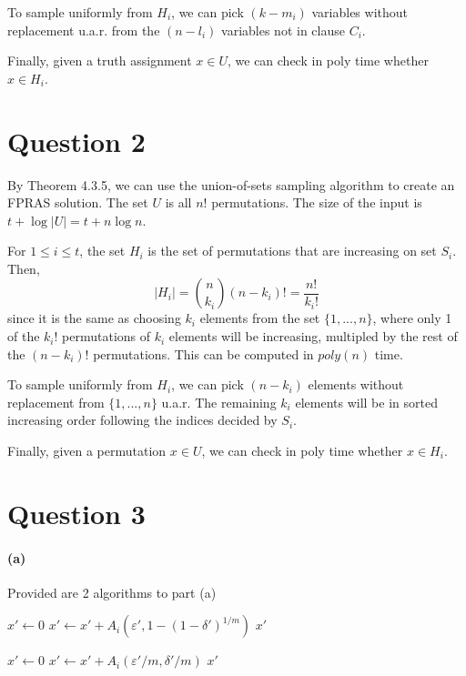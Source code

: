 \documentclass[11pt]{article} %
\begin{document}
To sample uniformly from $H_i$, we can pick $(k-m_i)$ variables without replacement u.a.r.
from the $(n-l_i)$ variables not in clause $C_i$.

Finally, given a truth assignment $x\in U$, we can check in poly time whether $x \in H_i$.

\clearpage
\section*{Question 2}

By Theorem 4.3.5, we can use the union-of-sets sampling algorithm to create an FPRAS solution.
The set $U$ is all $n!$ permutations.
The size of the input is $t+\log |U| = t+n\log n$.

For $1 \leq i \leq t$, the set $H_i$ is the set of permutations
that are increasing on set $S_i$.
Then,
\[|H_i| = \binom{n}{k_i}(n-k_i)!=\frac{n!}{k_i!}\]
since it is the same as choosing $k_i$ elements from the set $\{1,...,n\}$, 
where only 1 of the $k_i!$ permutations of $k_i$ elements will be increasing,
multipled by the rest of the $(n-k_i)!$ permutations.
This can be computed in $poly(n)$ time.

To sample uniformly from $H_i$, we can pick $(n-k_i)$ elements without replacement from $\{1,...,n\}$ u.a.r.
The remaining $k_i$ elements will be in sorted increasing order following the indices decided by $S_i$.

Finally, given a permutation $x\in U$, we can check in poly time whether $x\in H_i$.

\clearpage
\section*{Question 3}

\paragraph{(a)}
Provided are 2 algorithms to part (a)

\begin{algorithm}
\caption{$A'(\varepsilon', \delta')$}\label{alg:cap}
\begin{algorithmic}
\State $x' \gets 0$
\State $x' \gets x' + A_i (\varepsilon',1-(1-\delta')^{1/m})$
\EndFor
\State \Return $x'$
\end{algorithmic}
\end{algorithm}

\begin{algorithm}
\caption{$A'(\varepsilon', \delta')$}\label{alg:cap}
\begin{algorithmic}
\State $x' \gets 0$
\State $x' \gets x' + A_i (\varepsilon'/m,\delta'/m)$
\EndFor
\State \Return $x'$
\end{algorithmic}
\end{algorithm}
\end{document}
